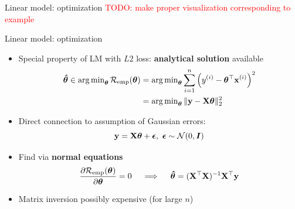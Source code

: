 \documentclass[11pt,compress,t,notes=noshow, xcolor=table]{beamer}
\begin{document}
\begin{frame}{Linear model: optimization}
\vfill
\textcolor{red}{TODO: make proper visualization corresponding to example}

\end{frame}


\begin{vbframe}{Linear model: optimization}

\begin{itemize}
    \item Special property of LM with $L2$ loss: \textbf{analytical solution}
    available
    \begin{align*}
        \bm{\hat\theta} \in 
        \operatorname{arg\,min}_{\bm{\theta}} \mathcal{R}_{\text{emp}}(\bm{\theta}) &=
        \operatorname{arg\,min}_{\bm{\theta}} \sum\limits_{i=1}^n \left(y^{(i)} - \bm{\theta}^\top \mathbf{x}^{(i)} \right)^2  \\
        &= \operatorname{arg\,min}_{\bm{\theta}} \| \mathbf{y} - \mathbf{X} \bm{\theta} \|^2_2
    \end{align*}
    \normalsize
    \item Direct connection to assumption of 
    Gaussian errors: $$\mathbf{y} = \mathbf{X} \bm{\theta} + \bm{\epsilon}, ~ \bm{\epsilon} \sim 
    \mathcal{N}(0, \boldsymbol{I})$$
    \item Find via \textbf{normal equations}
    $$
    \frac{\partial{\mathcal{R}_{\text{emp}}(\bm{\theta})}}{\partial \bm{\theta}} = 0 \quad\implies\quad \bm{\hat\theta} = (\mathbf{X}^\top \mathbf{X})^{-1} \mathbf{X}^\top \mathbf{y}
    $$
    \item Matrix inversion possibly expensive (for large $n$)
\end{itemize}

\end{vbframe}


\endlecture
\end{document}
